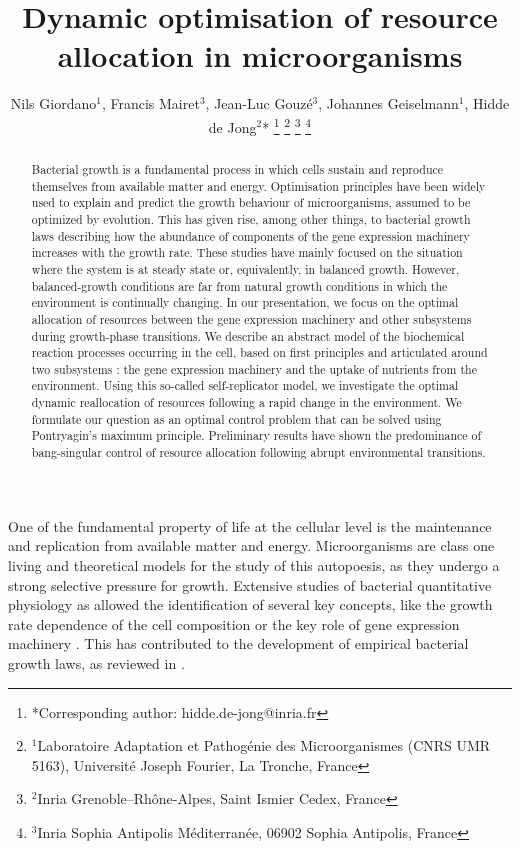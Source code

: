 \documentclass[a4paper, 10pt, conference]{ieeeconf}      %
\title{\LARGE \bf
Dynamic optimisation of resource allocation in microorganisms
}
\author{Nils Giordano$^{1}$, Francis Mairet$^{3}$, Jean-Luc Gouzé$^{3}$, Johannes Geiselmann$^{1}$, Hidde de Jong$^{2}$*%
\thanks{*Corresponding author: hidde.de-jong@inria.fr}%
\thanks{$^{1}$Laboratoire Adaptation et Pathog\'enie des Microorganismes (CNRS UMR 5163),
Universit\'e Joseph Fourier,
La Tronche, France}
\thanks{$^{2}$Inria Grenoble--Rh\^one-Alpes, Saint Ismier Cedex, France}
\thanks{$^{3}$Inria Sophia Antipolis M\'editerran\'ee, 06902 Sophia Antipolis, France}
}
\begin{document}
\maketitle
\thispagestyle{empty}
\pagestyle{empty}
\begin{abstract}

Bacterial growth is a fundamental process in which cells sustain and reproduce themselves from available matter and energy.
Optimisation principles have been widely used to explain and predict the growth behaviour of microorganisms, assumed to be optimized by evolution.
This has given rise, among other things, to bacterial growth laws describing how the abundance of components of the gene expression machinery increases with the growth rate. These studies have mainly focused on the situation where the system is at steady state or, equivalently, in balanced growth.
However, balanced-growth conditions are far from natural growth conditions in which the environment is continually changing.
In our presentation, we focus on the optimal allocation of resources between the gene expression machinery and other subsystems during growth-phase transitions.
We describe an abstract model of the biochemical reaction processes occurring in the cell, based on first principles and articulated around two subsystems : the gene expression machinery and the uptake of nutrients from the environment.
Using this so-called self-replicator model, we investigate the optimal dynamic reallocation of resources following a rapid change in the environment.
We formulate our question as an optimal control problem that can be solved using Pontryagin's maximum principle.
Preliminary results have shown the predominance of bang-singular control of resource allocation following abrupt environmental transitions.
\end{abstract}

One of the fundamental property of life at the cellular level is the maintenance and replication from available matter and energy.
Microorganisms are class one living and theoretical models for the study of this autopoesis, as they undergo a strong selective pressure for growth.
Extensive studies of bacterial quantitative physiology as allowed the identification of several key concepts, like the growth rate dependence of the cell composition or the key role of gene expression machinery \cite{scott_interdependence_2010}.
This has contributed to the development of empirical bacterial growth laws, as reviewed in \cite{scott_bacterial_2011}.
\end{document}
